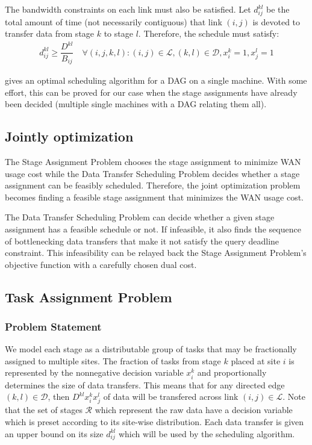 The bandwidth constraints on each link must also be satisfied.
Let $d_{ij}^{kl}$ be the total amount of time (not necessarily contiguous) that link $(i,j)$ is devoted to transfer data from stage $k$ to stage $l$.
Therefore, the schedule must satisfy:
\begin{align}
	d_{ij}^{kl} \geq \dfrac{D^{kl}}{B_{ij}} \quad \forall (i,j,k,l): (i,j)\in\mathcal{L},(k,l)\in\mathcal{D},x_i^k=1,x_j^l=1
\end{align}

\begin{conjecture}
	\cite{lawler1973optimal} gives an optimal scheduling algorithm for a DAG on a single machine.
	With some effort, this can be proved for our case when the stage assignments have already been decided (multiple single machines with a DAG relating them all). 
\end{conjecture}

\subsection{Jointly optimization}

The Stage Assignment Problem chooses the stage assignment to minimize WAN usage cost while the Data Transfer Scheduling Problem decides whether a stage assignment can be feasibly scheduled.
Therefore, the joint optimization problem becomes finding a feasible stage assignment that minimizes the WAN usage cost.

\begin{conjecture}
	The Data Transfer Scheduling Problem can decide whether a given stage assignment has a feasible schedule or not.
	If infeasible, it also finds the sequence of bottlenecking data transfers that make it not satisfy the query deadline constraint.
	This infeasibility can be relayed back the Stage Assignment Problem's objective function with a carefully chosen dual cost.
\end{conjecture}

\subsection{Task Assignment Problem}

\subsubsection{Problem Statement}

We model each stage as a distributable group of tasks that may be fractionally assigned to multiple sites.
The fraction of tasks from stage $k$ placed at site $i$ is represented by the nonnegative decision variable $x_i^k$ and proportionally determines the size of data transfers.
This means that for any directed edge $(k,l)\in\mathcal{D}$, then $D^{kl}x_i^kx_j^l$ of data will be transfered across link $(i,j)\in\mathcal{L}$.
Note that the set of stages $\mathcal{R}$ which represent the raw data have a decision variable which is preset according to its site-wise distribution.
Each data transfer is given an upper bound on its size $d_{ij}^{kl}$ which will be used by the scheduling algorithm.

